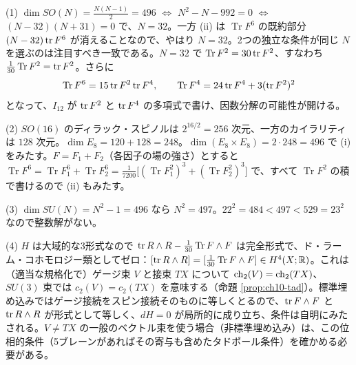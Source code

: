 \begin{solution}
(1) $\dim SO(N)=\frac{N(N-1)}{2}=496$ $\iff$ $N^2-N-992=0$ $\iff$ $(N-32)(N+31)=0$ で、$N=32$。一方 (ii) は $\operatorname{Tr}F^6$ の既約部分 $(N-32)\tr F^6$ が消えることなので、やはり $N=32$。2つの独立な条件が同じ $N$ を選ぶのは注目すべき一致である。$N=32$ で $\operatorname{Tr}F^2=30\tr F^2$、すなわち $\frac1{30}\operatorname{Tr}F^2=\tr F^2$。さらに
\[
\operatorname{Tr}F^6=15\tr F^2\tr F^4,\qquad \operatorname{Tr}F^4=24\tr F^4+3(\tr F^2)^2
\]
となって、$I_{12}$ が $\tr F^2$ と $\tr F^4$ の多項式で書け、因数分解の可能性が開ける。

(2) $SO(16)$ のディラック・スピノルは $2^{16/2}=256$ 次元、一方のカイラリティは $128$ 次元。$\dim E_8=120+128=248$。$\dim(E_8\times E_8)=2\cdot248=496$ で (i) をみたす。$F=F_1+F_2$（各因子の場の強さ）とすると $\operatorname{Tr}F^6=\operatorname{Tr}F_1^6+\operatorname{Tr}F_2^6=\frac1{7200}\bigl[(\operatorname{Tr}F_1^2)^3+(\operatorname{Tr}F_2^2)^3\bigr]$ で、すべて $\operatorname{Tr}F^2$ の積で書けるので (ii) もみたす。

(3) $\dim SU(N)=N^2-1=496$ なら $N^2=497$。$22^2=484<497<529=23^2$ なので整数解がない。

(4) $H$ は大域的な3形式なので $\tr R\wedge R-\frac1{30}\operatorname{Tr}F\wedge F$ は完全形式で、ド・ラーム・コホモロジー類としてゼロ：$[\tr R\wedge R]=[\tfrac1{30}\operatorname{Tr}F\wedge F]\in H^4(X;\mathbb{R})$。これは（適当な規格化で）ゲージ束 $V$ と接束 $TX$ について $\operatorname{ch}_2(V)=\operatorname{ch}_2(TX)$、$SU(3)$ 束では $c_2(V)=c_2(TX)$ を意味する（命題 \ref{prop:ch10-tad}）。標準埋め込みではゲージ接続をスピン接続そのものに等しくとるので、$\tr F\wedge F$ と $\tr R\wedge R$ が形式として等しく、$dH=0$ が局所的に成り立ち、条件は自明にみたされる。$V\ne TX$ の一般のベクトル束を使う場合（非標準埋め込み）は、この位相的条件（5ブレーンがあればその寄与も含めたタドポール条件）を確かめる必要がある。
\end{solution}
